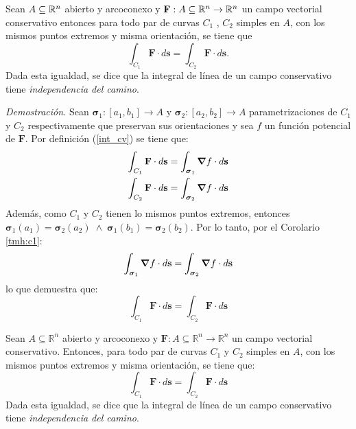 \begin{corollary}\label{tmh:c2}  Sean $A\subseteq\mathbb{R}^n$ abierto y arcoconexo y $\mathbf{F}:A\subseteq\mathbb{R}^n\to\mathbb{R}^n$  un campo vectorial conservativo entonces para todo par de curvas $C_1$ , $C_2$ simples en $A$, con los mismos puntos extremos y misma orientaci\'on, se tiene que
    \[
    \int_{C_1}\mathbf{F}\cdot d\mathbf{s}=\int_{C_2}\mathbf{F}\cdot d\mathbf{s}. 
    \]
    Dada esta igualdad, se dice que la integral de línea de un campo conservativo tiene \textit{independencia del camino}.

    \textit{Demostración.}   Sean $\boldsymbol{\sigma}_1:[a_1,b_1]\to A$  y $\boldsymbol{\sigma}_2:[a_2,b_2]\to A$  parametrizaciones de  $C_1$ y $C_2$ respectivamente que preservan sus orientaciones y sea  $f$ un funci\'on potencial de $\mathbf{F}$. Por definici\'on  (\ref{int_cv}) se tiene que:
    \begin{align*}
        \int_{C_1}\mathbf{F}\cdot d\mathbf{s}&=\int_{\boldsymbol{\sigma}_1}\grad f\cdot d\mathbf{s}\\
        \int_{C_2}\mathbf{F}\cdot d\mathbf{s}&=\int_{\boldsymbol{\sigma}_2}\grad f\cdot d\mathbf{s}
    \end{align*}
    Además, como $C_1$ y $C_2$ tienen lo mismos puntos extremos, entonces $\boldsymbol{\sigma}_1(a_1)=\boldsymbol{\sigma}_2(a_2)\;\land\;\boldsymbol{\sigma}_1(b_1)=\boldsymbol{\sigma}_2(b_2)$.
    Por lo tanto,  por el Corolario \ref{tmh:c1}:
    $$  \int_{\boldsymbol{\sigma}_1}\grad f\cdot d\mathbf{s}=\int_{\boldsymbol{\sigma}_2}\grad f\cdot d\mathbf{s} $$
     lo que demuestra que:   $$ \int_{C_1}\mathbf{F}\cdot d\mathbf{s}=\int_{C_2}\mathbf{F}\cdot d\mathbf{s}$$
   
\end{corollary}




\begin{corollary}\label{tmh:c2} 
Sean $A \subseteq \mathbb{R}^n$ abierto y arcoconexo y $\mathbf{F}: A \subseteq \mathbb{R}^n \to \mathbb{R}^n$ un campo vectorial conservativo. Entonces, para todo par de curvas $C_1$ y $C_2$ simples en $A$, con los mismos puntos extremos y misma orientación, se tiene que: 
\[ \int_{C_1} \mathbf{F} \cdot d\mathbf{s} = \int_{C_2} \mathbf{F} \cdot d\mathbf{s} \] 
Dada esta igualdad, se dice que la integral de línea de un campo conservativo tiene \emph{independencia del camino}. 
\end{corollary}

